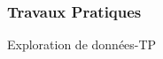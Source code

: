 \begin{frame}
  \frametitle{Travaux Pratiques}
  \begin{center}
  {Exploration de données-TP}
  \end{center}
\end{frame}

